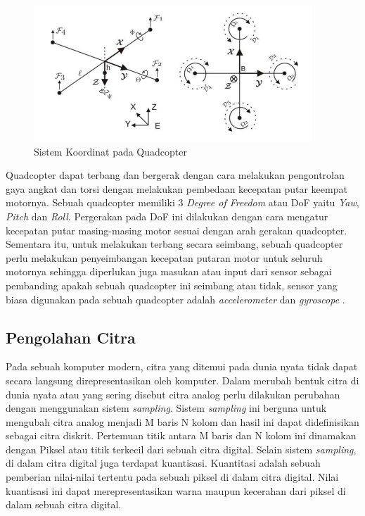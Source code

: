 \begin{figure} [H] \centering
  \includegraphics[scale=1]{gambar/quadcopter_koordinat.png}
  \caption{Sistem Koordinat pada Quadcopter}
  \label{fig:quad_coordinate}
\end{figure}

Quadcopter dapat terbang dan bergerak dengan cara melakukan pengontrolan gaya angkat dan torsi dengan melakukan pembedaan kecepatan putar keempat motornya. Sebuah quadcopter memiliki 3 \emph{Degree of Freedom} atau DoF yaitu \emph{Yaw}, \emph{Pitch} dan \emph{Roll}. Pergerakan pada DoF ini dilakukan dengan cara mengatur kecepatan putar masing-masing motor sesuai dengan arah gerakan quadcopter. Sementara itu, untuk melakukan terbang secara seimbang, sebuah quadcopter perlu melakukan penyeimbangan kecepatan putaran motor untuk seluruh motornya sehingga diperlukan juga masukan atau input dari sensor sebagai pembanding apakah sebuah quadcopter ini seimbang atau tidak, sensor yang biasa digunakan pada sebuah quadcopter adalah \emph{accelerometer} dan \emph{gyroscope} \cite{PraveenQuadcopter}.

\subsection{Pengolahan Citra}

Pada sebuah komputer modern, citra yang ditemui pada dunia nyata tidak dapat secara langsung direpresentasikan oleh komputer. Dalam merubah bentuk citra di dunia nyata atau yang sering disebut citra analog perlu dilakukan perubahan dengan menggunakan sistem \emph{sampling}. Sistem \emph{sampling} ini berguna untuk mengubah citra analog menjadi M baris N kolom dan hasil ini dapat didefinisikan sebagai citra diskrit. Pertemuan titik antara M baris dan N kolom ini dinamakan dengan Piksel atau titik terkecil dari sebuah citra digital. Selain sistem \emph{sampling}, di dalam citra digital juga terdapat kuantisasi. Kuantitasi adalah sebuah pemberian nilai-nilai tertentu pada sebuah piksel di dalam citra digital. Nilai kuantisasi ini dapat merepresentasikan warna maupun kecerahan dari piksel di dalam sebuah citra digital.

